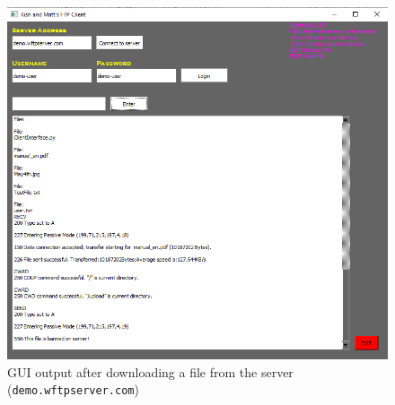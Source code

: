 \documentclass[10pt,twocolumn]{witseiepaper}
\def\code#1{\texttt{#1}}
\begin{document}
\begin{appendices}
\begin{figure}[h!]
\renewcommand{\thefigure}{\arabic{figure}}
\centering
\includegraphics[scale=0.8]{WftpGUI.png}
\caption{GUI output after downloading a file from the server (\code{demo.wftpserver.com})}
\label{fig: Wftp GUI}
\end{figure}

\end{appendices}

\end{document}
